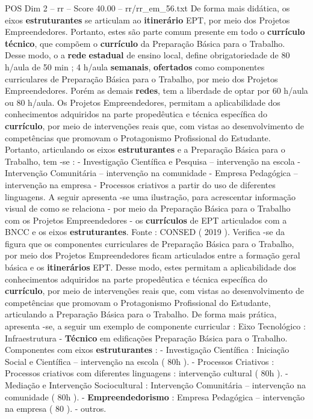\begin{textsample}{POS Dim 2 – rr – Score 40.00 – rr/rr\_em\_56.txt}
De forma mais didática, os eixos \textbf{estruturantes} se articulam ao \textbf{itinerário} EPT, por meio dos Projetos Empreendedores.
Portanto, estes são parte comum presente em todo o \textbf{currículo} \textbf{técnico}, que compõem o \textbf{currículo} da Preparação Básica para o Trabalho.
Desse modo, o a \textbf{rede} \textbf{estadual} de ensino local, define obrigatoriedade de 80 h/aula de 50 min ; 4 h/aula \textbf{semanais}, \textbf{ofertados} como componentes curriculares de Preparação Básica para o Trabalho, por meio dos Projetos Empreendedores.
Porém as demais \textbf{redes}, tem a liberdade de optar por 60 h/aula ou 80 h/aula.
Os Projetos Empreendedores, permitam a aplicabilidade dos conhecimentos adquiridos na parte propedêutica e técnica específica do \textbf{currículo}, por meio de intervenções reais que, com vistas ao desenvolvimento de competências que promovam o Protagonismo Profissional do Estudante.
Portanto, articulando os eixos \textbf{estruturantes} e a Preparação Básica para o Trabalho, tem -se : - Investigação Científica e Pesquisa – intervenção na escola - Intervenção Comunitária – intervenção na comunidade - Empresa Pedagógica – intervenção na empresa - Processos criativos a partir do uso de diferentes linguagens.
A seguir apresenta -se uma ilustração, para acrescentar informação visual de como se relaciona - por meio da Preparação Básica para o Trabalho com os Projetos Empreendedores - os \textbf{currículos} de EPT articulados com a BNCC e os eixos \textbf{estruturantes}.
Fonte : CONSED ( 2019 ).
Verifica -se da figura que os componentes curriculares de Preparação Básica para o Trabalho, por meio dos Projetos Empreendedores ficam articulados entre a formação geral básica e os \textbf{itinerários} EPT.
Desse modo, estes permitam a aplicabilidade dos conhecimentos adquiridos na parte propedêutica e técnica específica do \textbf{currículo}, por meio de intervenções reais que, com vistas ao desenvolvimento de competências que promovam o Protagonismo Profissional do Estudante, articulando a Preparação Básica para o Trabalho.
De forma mais prática, apresenta -se, a seguir um exemplo de componente curricular : Eixo Tecnológico : Infraestrutura - \textbf{Técnico} em edificações Preparação Básica para o Trabalho.
Componentes com eixos \textbf{estruturantes} : - Investigação Científica : Iniciação Social e Científica – intervenção na escola ( 80h ). - Processos Criativos : Processos criativos com diferentes linguagens : intervenção cultural ( 80h ). - Mediação e Intervenção Sociocultural : Intervenção Comunitária – intervenção na comunidade ( 80h ). - \textbf{Empreendedorismo} : Empresa Pedagógica – intervenção na empresa ( 80 ). - outros.

\end{textsample}
